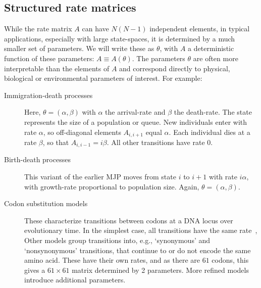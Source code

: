 \subsection{Structured rate matrices}
While the rate matrix $A$ can have $N(N-1)$ independent elements,
in typical applications, especially with large state-spaces, 
it is determined by a much smaller
set of parameters. We will write these as $\theta$, with
$A$ a deterministic function of these parameters: 
$A \equiv A(\theta)$. The parameters $\theta$ are often more 
interpretable than the elements of $A$ and correspond directly to
physical, biological or environmental parameters of interest. 
For example:
\begin{description}
  \item[Immigration-death processes] Here, $\theta = (\alpha,\beta)$
    with $\alpha$ the arrival-rate and $\beta$ the death-rate.
    The state represents the size of a 
    population or queue. New individuals
    enter with rate $\alpha$,
    so off-diagonal elements $A_{i,i+1}$ equal $\alpha$.
    Each individual dies %
    at a rate $\beta$, so that %
    $A_{i,i-1}=i\beta$.
    All other transitions have rate $0$. 
  \item[Birth-death processes] This variant of the
    earlier MJP moves from state $i$ 
    to $i+1$ with rate $i\alpha$, with growth-rate proportional to 
    population size. Again, 
    $\theta=(\alpha,\beta)$.
  \item[Codon substitution models] These %
    characterize transitions between codons at a 
    DNA locus %
    over evolutionary time. In the simplest case,
    all transitions have the same rate~\citep{jukescantor69}, 
    Other models group transitions 
    into, e.g., `synonymous' and `nonsynonymous' transitions, 
    that continue to or do not encode the same amino acid. 
    These have their own rates, and as 
    there are $61$ codons, this gives a 
    $61\times 61$ matrix determined by 2 parameters. More refined 
    models~\citep{goldman1994codon} introduce additional parameters. 
\end{description}
